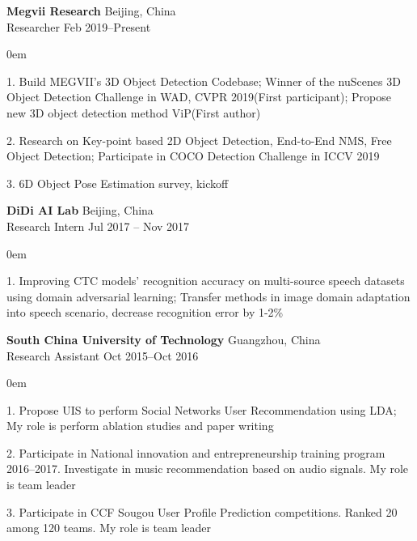 \documentclass[letterpaper]{article}
\renewenvironment{itemize}{
  \begin{list}{}{
    \setlength{\leftmargin}{1.5em}
  }
}{
  \end{list}
}
\begin{document}
\begin{itemize}
	\item \textbf{Megvii Research} \hfill Beijing, China
          \\  Researcher \hfill Feb 2019--Present
          \vspace{-0.1cm}
		  \begin{itemize}
		    \itemsep0em 
			\item 1. Build MEGVII's 3D Object Detection Codebase; Winner of the nuScenes 3D Object Detection Challenge in WAD, CVPR 2019(First participant); Propose new 3D object detection method ViP(First author)
			\item 2. Research on Key-point based 2D Object Detection, End-to-End NMS, Free Object Detection; Participate in COCO Detection Challenge in ICCV 2019
			\item 3. 6D Object Pose Estimation survey, kickoff
		  \end{itemize}
	\vspace{0.2cm}
	\item \textbf{DiDi AI Lab} \hfill Beijing, China
          \\ Research Intern \hfill Jul 2017 -- Nov 2017
		  \vspace{-0.1cm}
		  \begin{itemize}
		  	  \itemsep0em 
		      \item 1. Improving CTC models' recognition accuracy on multi-source speech datasets using domain adversarial learning; Transfer methods in image domain adaptation into speech scenario, decrease recognition error by 1-2\%
		  \end{itemize}
	\vspace{0.2cm}
	\item \textbf{South China University of Technology} \hfill Guangzhou, China
        \\ Research Assistant \hfill Oct 2015--Oct 2016
	    \vspace{-0.1cm}
		\begin{itemize}
		    \itemsep0em
			\item 1. Propose UIS to perform Social Networks User Recommendation using LDA; My role is perform ablation studies and paper writing
			\item 2. Participate in National innovation and entrepreneurship training program 2016--2017. Investigate in music recommendation based on audio signals. My role is team leader
			\item 3. Participate in CCF Sougou User Profile Prediction competitions. Ranked 20 among 120 teams. My role is team leader
		\end{itemize}
\end{itemize}
\end{document}
